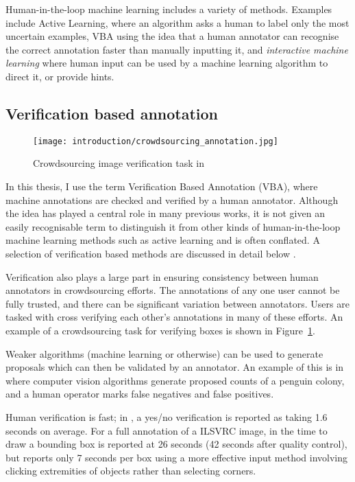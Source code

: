 Human-in-the-loop machine learning includes a variety of methods. Examples include Active Learning, where an algorithm asks a human to label only the most uncertain examples, \gls{VBA} using the idea that a human annotator can recognise the correct annotation faster than manually inputting it, and \emph{interactive machine learning} where human input can be used by a machine learning algorithm to direct it, or provide hints. 

\subsection{Verification based annotation}

\begin{figure}[ht]
  \centering
  \texttt{[image: introduction/crowdsourcing\_annotation.jpg]}
  \caption{Crowdsourcing image verification task in \cite{Su2012a}} 
  \label{fig:crowdsourcing}
\end{figure}

In this thesis, I use the term Verification Based Annotation (VBA), where machine annotations are checked and verified by a human annotator. Although the idea has played a central role in many previous works, it is not given an easily recognisable term to distinguish it from other kinds of human-in-the-loop machine learning methods such as active learning and is often conflated. A selection of verification based methods are discussed in detail below \cite{Yao2012, McNeill2011, Adhikaria2018, Castrejon2017, Papadopoulos2016, Russakovsky2015a}. 

Verification also plays a large part in ensuring consistency between human annotators in crowdsourcing efforts. The annotations of any one user cannot be fully trusted, and there can be significant variation between annotators. Users are tasked with cross verifying each other's annotations in many of these efforts. An example of a crowdsourcing task \cite{Su2012a} for verifying boxes is shown in Figure~\ref{fig:crowdsourcing}.

Weaker algorithms (machine learning or otherwise) can be used to generate proposals which can then be validated by an annotator. An example of this is in \cite{McNeill2011} where computer vision algorithms generate proposed counts of a penguin colony, and a human operator marks false negatives and false positives.

Human verification is fast; in \cite{Papadopoulos2016}, a yes/no verification is reported as taking 1.6 seconds on average. For a full annotation of a \gls{ILSVRC} image, in \cite{Su2012a} the time to draw a bounding box is reported at 26 seconds (42 seconds after quality control), but \cite{Papadopoulos2017} reports only 7 seconds per box using a more effective input method involving clicking extremities of objects rather than selecting corners. 

